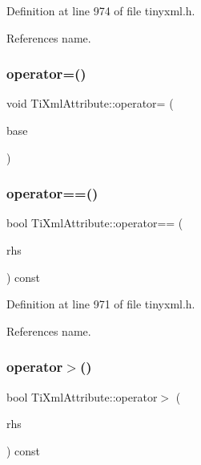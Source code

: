 Definition at line 974 of file tinyxml.\+h.



References name.

\hypertarget{class_ti_xml_attribute_a83b9c2a47dbfadf5029f2c0f13c18466}{}\label{class_ti_xml_attribute_a83b9c2a47dbfadf5029f2c0f13c18466} 
\subsubsection{\texorpdfstring{operator=()}{operator=()}}
{\footnotesize\ttfamily void Ti\+Xml\+Attribute\+::operator= (\begin{DoxyParamCaption}\item[{const \hyperlink{class_ti_xml_attribute}{Ti\+Xml\+Attribute} \&}]{base }\end{DoxyParamCaption})\hspace{0.3cm}{\ttfamily [private]}}

\hypertarget{class_ti_xml_attribute_a51eef33c2cdd55831447af46be0baf8b}{}\label{class_ti_xml_attribute_a51eef33c2cdd55831447af46be0baf8b} 
\subsubsection{\texorpdfstring{operator==()}{operator==()}}
{\footnotesize\ttfamily bool Ti\+Xml\+Attribute\+::operator== (\begin{DoxyParamCaption}\item[{const \hyperlink{class_ti_xml_attribute}{Ti\+Xml\+Attribute} \&}]{rhs }\end{DoxyParamCaption}) const\hspace{0.3cm}{\ttfamily [inline]}}



Definition at line 971 of file tinyxml.\+h.



References name.

\hypertarget{class_ti_xml_attribute_a697c2dde7ac60fccaa7049cee906eb3e}{}\label{class_ti_xml_attribute_a697c2dde7ac60fccaa7049cee906eb3e} 
\subsubsection{\texorpdfstring{operator$>$()}{operator>()}}
{\footnotesize\ttfamily bool Ti\+Xml\+Attribute\+::operator$>$ (\begin{DoxyParamCaption}\item[{const \hyperlink{class_ti_xml_attribute}{Ti\+Xml\+Attribute} \&}]{rhs }\end{DoxyParamCaption}) const\hspace{0.3cm}{\ttfamily [inline]}}



